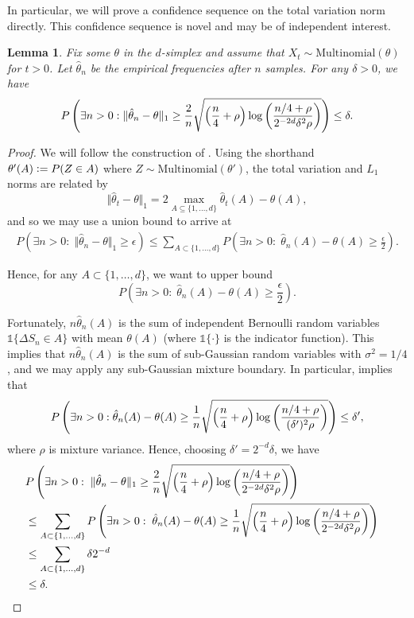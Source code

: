 \documentclass[11pt]{article}
\def\log{{\rm log}}
\newtheorem{lemma}{Lemma}[section]
\newcommand{\df}{\vcentcolon=}
\newcommand{\pfrac}[2]{\left(\frac{#1}{#2}\right)}
\begin{document}
In particular, we will prove a confidence sequence on the total variation norm directly. This confidence sequence is novel and may be of independent interest.
\begin{lemma}\label{lem:CS}
  Fix some $\theta$ in the $d$-simplex and assume that $X_t\sim\mathrm{Multinomial}(\theta)$ for $t>0$. Let $\hat\theta_n$ be the empirical frequencies after $n$ samples. For any $\delta>0$,  we have
\begin{equation}\label{eqn:multinomial.CS}
  P\left( \exists n > 0: \Vert \hat\theta_n - \theta\Vert_1
    \geq
  \frac{2}{n}\sqrt{\left(\frac{n}{4} + \rho\right)\log\pfrac{n/4+\rho}{2^{-2d}\delta^2 \rho}} 
  \right)
  \leq \delta.
\end{equation}  
\end{lemma}
\begin{proof}
  We will follow the construction of \cite{weissman2003inequalities}.
  Using the shorthand $\theta'(A) \df P(Z\in  A)$ where $Z\sim\mathrm{Multinomial}(\theta')$, the total variation and $L_1$ norms are related by
\[
  \Vert \hat\theta_t - \theta\Vert_1
  =
  2 \max_{A \subseteq \{1,\ldots, d\}} \hat\theta_t(A) - \theta(A),
\]
and so we may use a union bound to arrive at
\begin{align*}
  P(\exists n > 0:\; \Vert \hat\theta_n - \theta\Vert_1 \geq \epsilon)
  \leq
  \sum_{A \subset \{1,\ldots, d\}}
  P\left(\exists n > 0:\; \hat\theta_n(A) - \theta(A) \geq \frac{\epsilon}{2}\right).
\end{align*}

Hence, for any $A \subset \{1,\ldots, d\}$, we want to upper bound
\[
 P\left(\exists n > 0:\; \hat\theta_n(A) - \theta(A) \geq \frac{\epsilon}{2}\right).
\]

Fortunately, $n \hat\theta_n(A)$ is the sum of independent Bernoulli random variables $\mathds{1}\{ \Delta S_n \in A\}$ with mean $\theta(A)$ (where $\mathds{1}\{\cdot\}$ is the indicator function). This implies that $n \hat\theta_n(A)$ is the sum of sub-Gaussian random variables with $\sigma^2 = 1/4$, and we may apply any sub-Gaussian mixture boundary. In particular, \cite[Equation~14]{howard2018uniform} implies that
\[
  P\left(\exists n > 0: \hat\theta_n(A) - \theta(A) \geq
    \frac{1}{n}\sqrt{\left(\frac{n}{4} + \rho\right)\log\pfrac{n/4+\rho}{(\delta')^2 \rho}}
  \right)
  \leq
  \delta',
\]
where $\rho$ is mixture variance.
Hence, choosing $\delta' = 2^{-d} \delta$, we have
\begin{align*}
  \lefteqn{
  P\left(\exists n > 0:\; \Vert \hat\theta_n - \theta\Vert_1 \geq
  \frac{2}{n}\sqrt{\left(\frac{n}{4} + \rho\right)\log\pfrac{n/4+\rho}{2^{-2d}\delta^2 \rho}} 
\right)
  }\\
  &\leq
  \sum_{A \subset \{1,\ldots, d\}}
  P\left(\exists n > 0:\; \hat\theta_n(A) - \theta(A)
  \geq
    \frac{1}{n}\sqrt{\left(\frac{n}{4} + \rho\right)\log\pfrac{n/4+\rho}{2^{-2d}\delta^2 \rho}}  
  \right)\\
  &\leq
    \sum_{A \subset \{1,\ldots, d\}}
    \delta 2^{-d}\\
  &\leq
  \delta.
\end{align*}



\end{proof}
\end{document}
